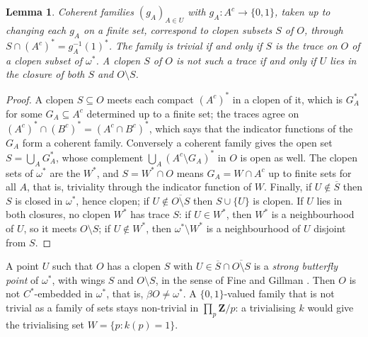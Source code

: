 \documentclass[11pt,a4paper]{amsart}
\newtheorem{lemma}[theorem]{Lemma}
\theoremstyle{definition}
\theoremstyle{remark}
\newcommand{\Z}{\mathbf Z}
\begin{document}
\begin{lemma}\label{l:clopen}
Coherent families $(g_A)_{A\in U}$ with $g_A\colon A^c\to\{0,1\}$, taken up to changing each $g_A$ on a finite set, correspond to clopen subsets $S$ of $O$, through $S\cap(A^c)^*=g_A^{-1}(1)^*$. The family is trivial if and only if $S$ is the trace on $O$ of a clopen subset of $\omega^*$. A clopen $S$ of $O$ is not such a trace if and only if $U$ lies in the closure of both $S$ and $O\setminus S$.
\end{lemma}

\begin{proof}
A clopen $S\subseteq O$ meets each compact $(A^c)^*$ in a clopen of it, which is $G_A^*$ for some $G_A\subseteq A^c$ determined up to a finite set; the traces agree on $(A^c)^*\cap(B^c)^*=(A^c\cap B^c)^*$, which says that the indicator functions of the $G_A$ form a coherent family. Conversely a coherent family gives the open set $S=\bigcup_AG_A^*$, whose complement $\bigcup_A(A^c\setminus G_A)^*$ in $O$ is open as well. The clopen sets of $\omega^*$ are the $W^*$, and $S=W^*\cap O$ means $G_A=W\cap A^c$ up to finite sets for all $A$, that is, triviality through the indicator function of $W$. Finally, if $U\notin\overline S$ then $S$ is closed in $\omega^*$, hence clopen; if $U\notin\overline{O\setminus S}$ then $S\cup\{U\}$ is clopen. If $U$ lies in both closures, no clopen $W^*$ has trace $S$: if $U\in W^*$, then $W^*$ is a neighbourhood of $U$, so it meets $O\setminus S$; if $U\notin W^*$, then $\omega^*\setminus W^*$ is a neighbourhood of $U$ disjoint from $S$.
\end{proof}

A point $U$ such that $O$ has a clopen $S$ with $U\in\overline S\cap\overline{O\setminus S}$ is a \emph{strong butterfly point} of $\omega^*$, with wings $S$ and $O\setminus S$, in the sense of Fine and Gillman \cite{fg}. Then $O$ is not $C^*$-embedded in $\omega^*$, that is, $\beta O\neq\omega^*$. A $\{0,1\}$-valued family that is not trivial as a family of sets stays non-trivial in $\prod_p\Z/p$: a trivialising $k$ would give the trivialising set $W=\{p:k(p)=1\}$.
\end{document}
